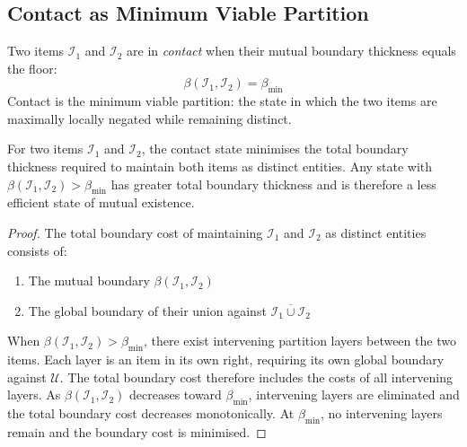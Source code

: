 \subsection{Contact as Minimum Viable Partition}
\label{subsec:contact_min}

\begin{definition}[Contact]
\label{def:contact}
Two items $\mathcal{I}_1$ and $\mathcal{I}_2$ are in \emph{contact} when their
mutual boundary thickness equals the floor:
\begin{equation}
    \beta(\mathcal{I}_1, \mathcal{I}_2) = \beta_{\min}
    \label{eq:contact}
\end{equation}
Contact is the minimum viable partition: the state in which the two items are
maximally locally negated while remaining distinct.
\end{definition}

\begin{theorem}
\label{thm:contact_optimum}
For two items $\mathcal{I}_1$ and $\mathcal{I}_2$, the contact state minimises
the total boundary thickness required to maintain both items as distinct entities.
Any state with $\beta(\mathcal{I}_1, \mathcal{I}_2) > \beta_{\min}$ has greater
total boundary thickness and is therefore a less efficient state of mutual
existence.
\end{theorem}

\begin{proof}
The total boundary cost of maintaining $\mathcal{I}_1$ and $\mathcal{I}_2$ as
distinct entities consists of:
\begin{enumerate}
    \item The mutual boundary $\beta(\mathcal{I}_1, \mathcal{I}_2)$
    \item The global boundary of their union against $\overline{\mathcal{I}_1
          \cup \mathcal{I}_2}$
\end{enumerate}
When $\beta(\mathcal{I}_1, \mathcal{I}_2) > \beta_{\min}$, there exist
intervening partition layers between the two items. Each layer is an item in its
own right, requiring its own global boundary against $\mathcal{U}$. The total
boundary cost therefore includes the costs of all intervening layers. As
$\beta(\mathcal{I}_1, \mathcal{I}_2)$ decreases toward $\beta_{\min}$,
intervening layers are eliminated and the total boundary cost decreases
monotonically. At $\beta_{\min}$, no intervening layers remain and the boundary
cost is minimised.
\end{proof}

